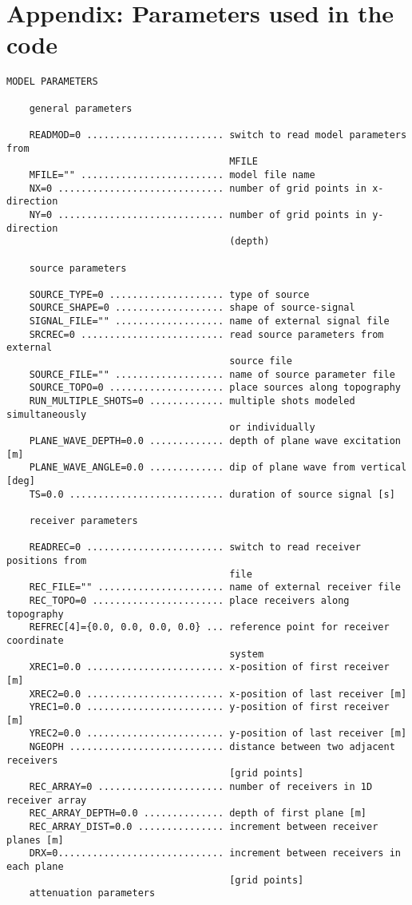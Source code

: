 \section{Appendix: Parameters used in the code}
\label{parameters}

\begin{verbatim}
MODEL PARAMETERS
    
    general parameters
    
    READMOD=0 ........................ switch to read model parameters from
                                       MFILE
    MFILE="" ......................... model file name
    NX=0 ............................. number of grid points in x-direction
    NY=0 ............................. number of grid points in y-direction
                                       (depth)
    
    source parameters
    
    SOURCE_TYPE=0 .................... type of source
    SOURCE_SHAPE=0 ................... shape of source-signal
    SIGNAL_FILE="" ................... name of external signal file
    SRCREC=0 ......................... read source parameters from external
                                       source file
    SOURCE_FILE="" ................... name of source parameter file
    SOURCE_TOPO=0 .................... place sources along topography
    RUN_MULTIPLE_SHOTS=0 ............. multiple shots modeled simultaneously
                                       or individually
    PLANE_WAVE_DEPTH=0.0 ............. depth of plane wave excitation [m]
    PLANE_WAVE_ANGLE=0.0 ............. dip of plane wave from vertical [deg]
    TS=0.0 ........................... duration of source signal [s]
    
    receiver parameters
    
    READREC=0 ........................ switch to read receiver positions from
                                       file
    REC_FILE="" ...................... name of external receiver file
    REC_TOPO=0 ....................... place receivers along topography
    REFREC[4]={0.0, 0.0, 0.0, 0.0} ... reference point for receiver coordinate 
                                       system
    XREC1=0.0 ........................ x-position of first receiver [m]
    XREC2=0.0 ........................ x-position of last receiver [m]
    YREC1=0.0 ........................ y-position of first receiver [m]
    YREC2=0.0 ........................ y-position of last receiver [m]
    NGEOPH ........................... distance between two adjacent receivers 
                                       [grid points]
    REC_ARRAY=0 ...................... number of receivers in 1D receiver array
    REC_ARRAY_DEPTH=0.0 .............. depth of first plane [m] 
    REC_ARRAY_DIST=0.0 ............... increment between receiver planes [m]
    DRX=0............................. increment between receivers in each plane 
                                       [grid points]
    attenuation parameters
    

\end{verbatim}
